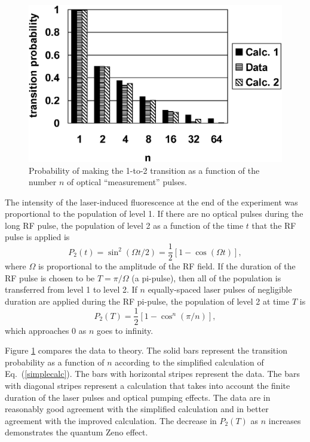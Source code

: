 \documentclass[12pt]{article}
\begin{document}
\begin{figure}[htb]
\begin{center}
\includegraphics[width=5in]{data_12a.eps}
\end{center}
\caption{\label{datafig}Probability of making the 1-to-2 transition
as a function of the number $n$ of optical ``measurement'' pulses.}
\end{figure}

The intensity of the laser-induced fluorescence at the end of the
experiment was proportional to the population of level 1. If there
are no optical pulses during the long RF pulse, the population of
level 2 as a function of the time $t$ that the RF pulse is applied
is
\begin{equation}
P_2(t)=\sin^2(\Omega t/2) = \frac{1}{2}[1-\cos(\Omega
t)],\label{rabiflop}
\end{equation}
where $\Omega$ is proportional to the amplitude of the RF field. If
the duration of the RF pulse is chosen to be $T=\pi/\Omega$ (a
pi-pulse), then all of the population is transferred from level 1 to
level 2. If $n$ equally-spaced laser pulses of negligible duration
are applied during the RF pi-pulse, the population of level 2 at
time $T$ is
\begin{equation}
P_2(T)=\frac{1}{2}\left[1-\cos^n(\pi/n)\right],\label{simplecalc}
\end{equation}
which approaches 0 as $n$ goes to infinity.

Figure \ref{datafig} compares the data to theory. The solid bars
represent the transition probability as a function of $n$ according
to the simplified calculation of Eq.~(\ref{simplecalc}). The bars
with horizontal stripes represent the data.  The bars with diagonal
stripes represent a calculation that takes into account the finite
duration of the laser pulses and optical pumping effects. The data
are in reasonably good agreement with the simplified calculation and
in better agreement with the improved calculation. The decrease in
$P_2(T)$ as $n$ increases demonstrates the quantum Zeno effect.
\end{document}
